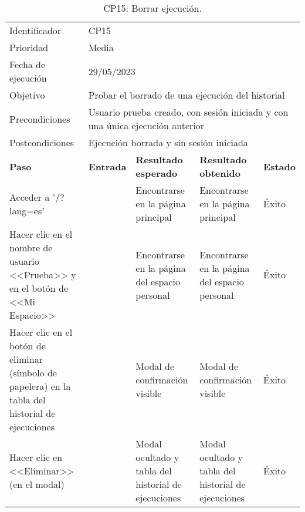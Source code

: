 \begin{table}[H]
\begin{tabular}{p{}p{}p{}p{}p{}}
\rowcolor{gray!25}
Identificador   & \multicolumn{4}{l}{CP15}                                                   \\
Prioridad   & \multicolumn{4}{l}{Media}                                                    \\
\rowcolor{gray!25}
Fecha de ejecución   & \multicolumn{4}{l}{29/05/2023}                                                    \\
Objetivo        & \multicolumn{4}{p{0.80\textwidth}}{Probar el borrado de una ejecución del historial}                                                     \\
\rowcolor{gray!25}
Precondiciones  & \multicolumn{4}{p{0.80\textwidth}}{Usuario prueba creado, con sesión iniciada y con una única ejecución anterior}                                                     \\
Postcondiciones & \multicolumn{4}{l}{Ejecución borrada y sin sesión iniciada}                                                     \\ \hline
\rowcolor{gray!25}
\textbf{Paso}   & \textbf{Entrada} & \textbf{Resultado esperado} & \textbf{Resultado obtenido} & \textbf{Estado} \\ \hline
Acceder a '/?lang=es'                                 &                        & Encontrarse en la página principal                                   & Encontrarse en la página principal                           & Éxito  \\ \hline
Hacer clic en el nombre de usuario <<Prueba>> y en el botón de <<Mi Espacio>>  &     & Encontrarse en la página del espacio personal                  & Encontrarse en la página del espacio personal                       & Éxito  \\ \hline 
Hacer clic en el botón de eliminar (símbolo de papelera) en la tabla del historial de ejecuciones &                     & Modal de confirmación visible                                     & Modal de confirmación visible                     & Éxito                            \\ \hline
Hacer clic en <<Eliminar>> (en el modal)              &                        & Modal ocultado y tabla del historial de ejecuciones                    & Modal ocultado y tabla del historial de ejecuciones            & Éxito                            \\ \hline
\end{tabular}
\caption{CP15: Borrar ejecución.}
\end{table}

